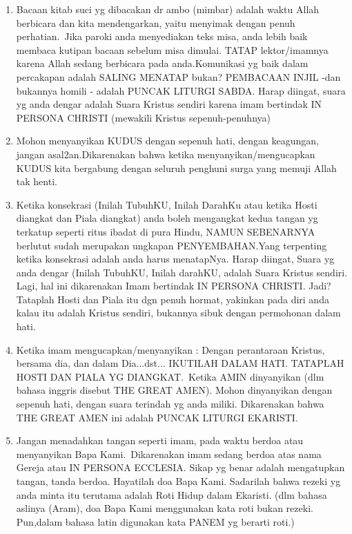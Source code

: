 \begin{enumerate}
\item Bacaan kitab suci yg dibacakan dr ambo (mimbar) adalah waktu Allah
berbicara dan kita mendengarkan, yaitu menyimak dengan penuh
perhatian.~Jika paroki anda menyediakan teks misa, anda lebih baik
membaca kutipan bacaan sebelum misa dimulai. TATAP lektor/imamnya
karena Allah sedang berbicara pada anda.Komunikasi yg baik dalam
percakapan adalah SALING MENATAP bukan? PEMBACAAN INJIL -dan bukannya
homili - adalah PUNCAK LITURGI SABDA. Harap diingat, suara yg anda
dengar adalah Suara Kristus sendiri karena imam bertindak IN PERSONA
CHRISTI (mewakili Kristus sepenuh-penuhnya)~  
\item Mohon menyanyikan
KUDUS dengan sepenuh hati, dengan keagungan, jangan asal2an.Dikarenakan
bahwa ketika menyanyikan/mengucapkan KUDUS kita bergabung dengan
seluruh penghuni surga yang memuji Allah tak henti.~  
\item Ketika
konsekrasi (Inilah TubuhKU, Inilah DarahKu atau ketika Hosti diangkat
dan Piala diangkat) anda boleh mengangkat kedua tangan yg terkatup
seperti ritus ibadat di pura Hindu, NAMUN SEBENARNYA berlutut sudah
merupakan ungkapan PENYEMBAHAN.Yang terpenting ketika konsekrasi adalah
anda harus menatapNya. Harap diingat, Suara yg anda dengar (Inilah
TubuhKU, Inilah darahKU, adalah Suara Kristus sendiri. Lagi, hal ini
dikarenakan Imam bertindak IN PERSONA CHRISTI. Jadi? Tataplah Hosti dan
Piala itu dgn penuh hormat, yakinkan pada diri anda kalau itu adalah
Kristus sendiri, bukannya sibuk dengan permohonan dalam hati.~  

\item Ketika imam mengucapkan/menyanyikan : {\textquotedbl}Dengan perantaraan
Kristus, bersama dia, dan dalam Dia...dst...{\textquotedbl} IKUTILAH
DALAM HATI. TATAPLAH HOSTI DAN PIALA YG DIANGKAT.~Ketika
{\textquotedbl}AMIN{\textquotedbl} dinyanyikan (dlm bahasa inggris
disebut THE GREAT AMEN{\textquotedbl}). Mohon dinyanyikan dengan
sepenuh hati, dengan suara terindah yg anda miliki. Dikarenakan bahwa
THE GREAT AMEN ini adalah PUNCAK LITURGI EKARISTI.~  
\item Jangan menadahkan tangan seperti imam, pada waktu berdoa atau menyanyikan Bapa
Kami.~Dikarenakan imam sedang berdoa atas nama Gereja atau IN PERSONA
ECCLESIA. Sikap yg benar adalah mengatupkan tangan, tanda berdoa.
Hayatilah doa Bapa Kami. Sadarilah bahwa
{\textquotedbl}rezeki{\textquotedbl} yg anda minta itu terutama adalah
{\textquotedbl}Roti Hidup{\textquotedbl} dalam Ekaristi. (dlm bahasa
aslinya (Aram), doa Bapa Kami menggunakan kata
{\textquotedbl}roti{\textquotedbl} bukan rezeki. Pun,dalam bahasa latin
digunakan kata {\textquotedbl}PANEM{\textquotedbl} yg berarti roti.)~ 


\end{enumerate}
